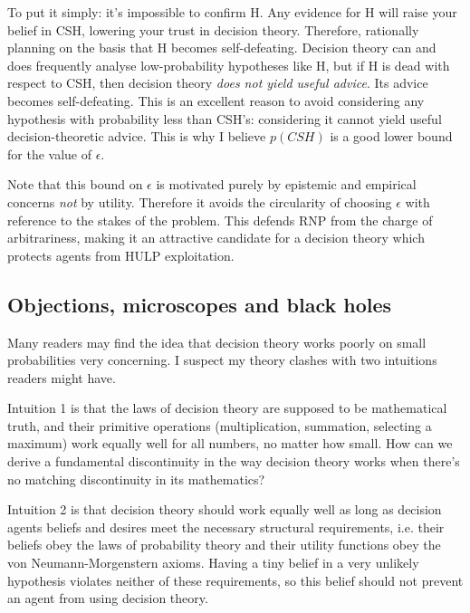 \documentclass{article}
\begin{document}
To put it simply: it's impossible to confirm H. Any evidence for H will raise your belief in CSH, lowering your trust in decision theory. Therefore, rationally planning on the basis that H becomes self-defeating. Decision theory can and does frequently analyse low-probability hypotheses like H, but if H is dead with respect to CSH, then decision theory \textit{does not yield useful advice}. Its advice becomes self-defeating. This is an excellent reason to avoid considering any hypothesis with probability less than CSH's: considering it cannot yield useful decision-theoretic advice. This is why I believe \(p(CSH)\) is a good lower bound for the value of \(\epsilon\).

Note that this bound on \(\epsilon\) is motivated purely by epistemic and empirical concerns \textemdash{} \textit{not} by utility. Therefore it avoids the circularity of choosing \(\epsilon\) with reference to the stakes of the problem. This defends RNP from the charge of arbitrariness, making it an attractive candidate for a decision theory which protects agents from HULP exploitation.

\subsection{Objections, microscopes and black holes}

Many readers may find the idea that decision theory works poorly on small probabilities very concerning. I suspect my theory clashes with two intuitions readers might have. 

Intuition 1 is that the laws of decision theory are supposed to be mathematical truth, and their primitive operations (multiplication, summation, selecting a maximum) work equally well for all numbers, no matter how small. How can we derive a fundamental discontinuity in the way decision theory works when there's no matching discontinuity in its mathematics? %

Intuition 2 is that decision theory should work equally well as long as decision agents beliefs and desires meet the necessary structural requirements, i.e. their beliefs obey the laws of probability theory and their utility functions obey the von Neumann-Morgenstern axioms. Having a tiny belief in a very unlikely hypothesis violates neither of these requirements, so this belief should not prevent an agent from using decision theory. %
\end{document}
